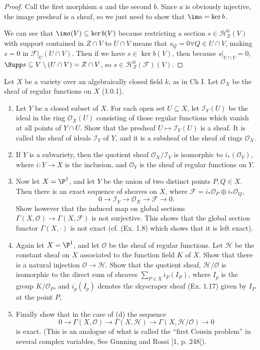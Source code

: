 \begin{proof}
	Call the first morphism $a $ and the second $b $.
	Since $a $ is obviously injective, the image presheaf is a sheaf, so we just need to show that $\im a = \ker b $.

	We can see that $\im a(V) \subseteq \ker b(V) $ because restricting a section $s \in \mathscr{H}_Z^0(V) $ with support contained in $Z\cap V $ to $U \cap V$ means that $s_Q = 0 \forall Q \in U\cap V $, making $s=0 $ in $\mathscr{F}|_U(U\cap V) $.
	Then if we have $s \in \ker b(V)$, then because $s|_{U\cap V}=0 $, $\Supp s \subseteq V \setminus (U\cap V) = Z\cap V$, so $s \in \mathscr{H}_Z^0(\mathscr{F})(V) $.
\end{proof}

\begin{exercise} %
	Let $X$ be a variety over an algebraically closed field $k$, as in Ch I. Let $\mathcal{O}_X $ be the sheaf of regular functions on $X$ (1.0.1).
	\begin{enumerate}
		\item Let $Y$ be a closed subset of $X$. For each open set $U \subseteq X$, let $\mathscr{I}_Y(U)$ be the ideal in the ring $\mathcal{O}_X(U)$ consisting of those regular functions which vanish at all points of $Y \cap U$. Show that the presheaf $U \mapsto \mathscr{I}_Y(U)$ is a sheaf. It is called the sheaf of ideals $\mathscr{I}_Y$ of $Y$, and it is a subsheaf of the sheaf of rings $\mathcal{O}_X $.
		\item If $Y$ is a subvariety, then the quotient sheaf $\mathcal{O}_X/\mathscr{I}_Y$ is isomorphic to $i_\ast(\mathcal{O}_Y)$, where $i: Y \to X$ is the inclusion, and $\mathcal{O}_Y$ is the sheaf of regular functions on $Y$.
		\item Now let $X = \P^1$, and let $Y$ be the union of two distinct points $P,Q \in X$. Then there is an exact sequence of sheaves on $X$, where $\mathscr{F} = i_\ast\mathcal{O}_P \oplus i_\ast\mathcal{O}_Q$,
			\[
			0\to \mathscr{I}_Y \to \mathcal{O}_X \to \mathscr{F} \to 0.
		\]
		Show however that the induced map on global sections $\Gamma(X,\mathcal{O}) \to \Gamma(X,\mathscr{F})$ is not surjective. This shows that the global section functor $\Gamma(X,\cdot)$ is not exact (cf. (Ex. 1.8) which shows that it is left exact).
		\item Again let $X = \P^1$, and let $\mathcal{O}$ be the sheaf of regular functions. Let $\mathscr{H}$ be the constant sheaf on $X$ associated to the function field $K$ of $X$. Show that there is a natural injection $\mathcal{O} \to \mathscr{H}$. Show that the quotient sheaf, $\mathscr{H} / \mathcal{O}$ is isomorphic to the direct sum of sheaves $\sum_{P\in X} i_P(I_P) $, where $I_p$ is the group $K/\mathcal{O}_P$, and $i_p(I_p)$ denotes the skyscraper sheaf (Ex. 1.17) given by $I_P$ at the point $P$,
		\item Finally show that in the case of (d) the sequence
		\[
			0\to \Gamma(X,\mathcal{O}) \to \Gamma(X,\mathscr{H}) \to \Gamma(X,\mathscr{H}/\mathcal{O}) \to 0
		\]
		is exact. (This is an analogue of what is called the ``first Cousin problem'' in several complex variables, See Gunning and Rossi [1, p. 248]).
	\end{enumerate}
\end{exercise}
